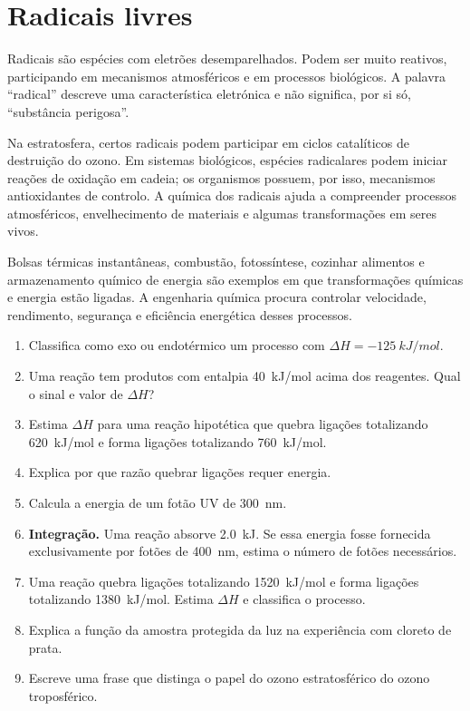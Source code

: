 \documentclass[11pt,a4paper,oneside]{book}
\begin{document}
\section{Radicais livres}
Radicais são espécies com eletrões desemparelhados. Podem ser muito reativos, participando em mecanismos atmosféricos e em processos biológicos. A palavra ``radical'' descreve uma característica eletrónica e não significa, por si só, ``substância perigosa''.

Na estratosfera, certos radicais podem participar em ciclos catalíticos de destruição do ozono. Em sistemas biológicos, espécies radicalares podem iniciar reações de oxidação em cadeia; os organismos possuem, por isso, mecanismos antioxidantes de controlo. A química dos radicais ajuda a compreender processos atmosféricos, envelhecimento de materiais e algumas transformações em seres vivos.

\begin{mundo}
Bolsas térmicas instantâneas, combustão, fotossíntese, cozinhar alimentos e armazenamento químico de energia são exemplos em que transformações químicas e energia estão ligadas. A engenharia química procura controlar velocidade, rendimento, segurança e eficiência energética desses processos.
\end{mundo}

\begin{exercicios}
\begin{enumerate}
  \item Classifica como exo ou endotérmico um processo com $\Delta H=-\SI{125}{kJ/mol}$.
  \item Uma reação tem produtos com entalpia \SI{40}{kJ/mol} acima dos reagentes. Qual o sinal e valor de $\Delta H$?
  \item Estima $\Delta H$ para uma reação hipotética que quebra ligações totalizando \SI{620}{kJ/mol} e forma ligações totalizando \SI{760}{kJ/mol}.
  \item Explica por que razão quebrar ligações requer energia.
  \item Calcula a energia de um fotão UV de \SI{300}{nm}.
  \item \textbf{Integração.} Uma reação absorve \SI{2.0}{kJ}. Se essa energia fosse fornecida exclusivamente por fotões de \SI{400}{nm}, estima o número de fotões necessários.
  \item Uma reação quebra ligações totalizando \SI{1520}{kJ/mol} e forma ligações totalizando \SI{1380}{kJ/mol}. Estima $\Delta H$ e classifica o processo.
  \item Explica a função da amostra protegida da luz na experiência com cloreto de prata.
  \item Escreve uma frase que distinga o papel do ozono estratosférico do ozono troposférico.
\end{enumerate}
\end{exercicios}
\end{document}
